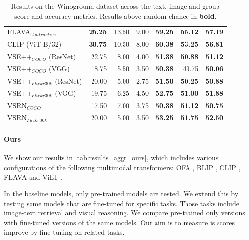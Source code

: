 \begin{table}[ht]
\begin{tabular}{l|rrr|rrr}
 FLAVA$_{Contrastive}$        & \textbf{25.25} & 13.50          & 9.00           & \textbf{59.25} & \textbf{55.12} & \textbf{57.19} \\
 CLIP (ViT-B/32)              & \textbf{30.75} & 10.50          & 8.00           & \textbf{60.38} & \textbf{53.25} & \textbf{56.81} \\
 VSE++$_{COCO}$ (ResNet)      & 22.75          & 8.00           & 4.00           & \textbf{51.38} & \textbf{50.88} & \textbf{51.12} \\
 VSE++$_{COCO}$ (VGG)         & 18.75          & 5.50           & 3.50           & \textbf{50.38} & 49.75          & \textbf{50.06} \\
 VSE++$_{Flickr30k}$ (ResNet) & 20.00          & 5.00           & 2.75           & \textbf{51.50} & \textbf{50.25} & \textbf{50.88} \\
 VSE++$_{Flickr30k}$ (VGG)    & 19.75          & 6.25           & 4.50           & \textbf{52.75} & \textbf{51.00} & \textbf{51.88} \\
 VSRN$_{COCO}$                & 17.50          & 7.00           & 3.75           & \textbf{50.38} & \textbf{51.12} & \textbf{50.75} \\
 VSRN$_{Flickr30k}$           & 20.00          & 5.00           & 3.50           & \textbf{53.25} & \textbf{51.75} & \textbf{52.50} \\
\bottomrule
\end{tabular}
\caption{Results on the Winoground dataset across the text, image and group score and accuracy metrics. Results above random chance in \textbf{bold}.}
\label{tab:results_aggr_baseline}
\end{table}

\paragraph{Ours}

We show our results in \cref{tab:results_aggr_ours}, which includes various configurations of the following multimodal transformers: OFA \cite{wang2022unifying}, BLIP \cite{li2022blip}, CLIP \cite{radford2021clip}, FLAVA \cite{singh2022flava} and ViLT \cite{kim2021vilt}.

In the baseline models, only pre-trained models are tested. We extend this by testing some models that are fine-tuned for specific tasks. Those tasks include image-text retrieval and visual reasoning. We compare pre-trained only versions with fine-tuned versions of the same models. Our aim is to measure is scores improve by fine-tuning on related tasks.

